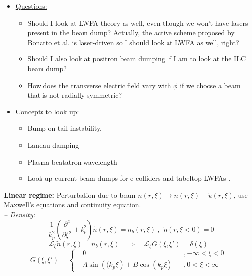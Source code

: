 \documentclass[%
onecolumn, notitlepage,
 amsmath,amssymb,
 aps,
]{article}
\begin{document}
\begin{itemize}
\item[\textcolor{MancPurple}{\textbullet}] \underline{Questions:} 
\begin{itemize}
\item[\textcolor{MancPurple}{\textopenbullet}] Should I look at LWFA theory as well, even though we won't have lasers present in the beam dump? Actually, the active scheme proposed by Bonatto et al. is laser-driven so I should look at LWFA as well, right?
\item[\textcolor{MancPurple}{\textopenbullet}] Should I also look at positron beam dumping if I am to look at the ILC beam dump?
\item[\textcolor{MancPurple}{\textopenbullet}] How does the transverse electric field vary with $\phi$ if we choose a beam that is not radially symmetric? 
\end{itemize}


\item[\textcolor{MancPurple}{\textbullet}] \underline{Concepts to look up:} 
\begin{itemize}
\item[\textcolor{MancPurple}{\textopenbullet}] Bump-on-tail instability.
\item[\textcolor{MancPurple}{\textopenbullet}] Landau damping
\item[\textcolor{MancPurple}{\textopenbullet}] Plasma beatatron-wavelength
\item[\textcolor{MancPurple}{\textopenbullet}]  Look up current beam dumps for e-colliders and tabeltop LWFAs .
\end{itemize}


\end{itemize}
\textbf{Linear regime:}
Perturbation due to beam $n\left(r,\xi \right)\to n\left(r,\xi \right)+\tilde{n}\left(r,\xi \right)$, use Maxwell's equations and continuity equation.\\
\textit{-- Density:}
\begin{equation}
-\frac{1}{k_p^2}\left(\frac{\partial^2 }{\partial \xi^2}+k_p^2\right)\tilde{n}\left(r,\xi \right)=n_b\left(r,\xi \right) ~,~~\tilde{n}\left(r,\xi<0 \right)=0
\end{equation}
\begin{equation}
\mathcal{L}_{\xi}\tilde{n}\left(r,\xi \right)=n_b\left(r,\xi \right) \quad \Rightarrow \quad \mathcal{L}_{\xi}G\left(\xi,\xi'\right)=\delta\left(\xi\right)
\end{equation}
\begin{equation}
G\left(\xi,\xi'\right)=\left\{ \begin{aligned}
&0&&, -\infty<\xi<0\\
&A\sin\left((k_p\xi \right) + B\cos\left(k_p\xi \right)&&, 0<\xi<\infty
\end{aligned}\right.
\end{equation}
\end{document}
